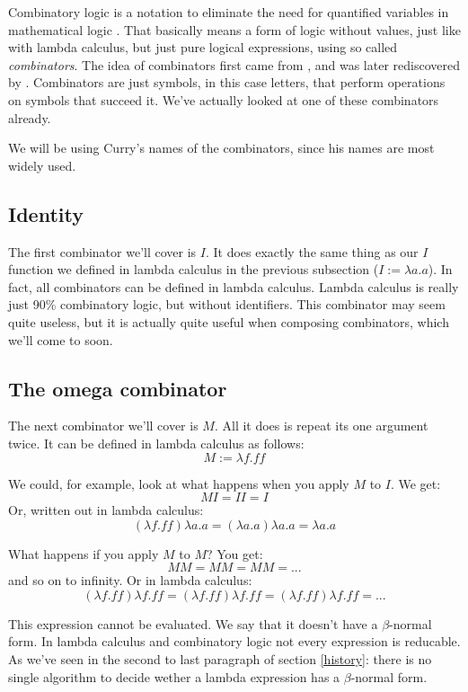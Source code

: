 \documentclass[11pt]{book}
\begin{document}
Combinatory logic is a notation to eliminate the need for quantified variables
in mathematical logic \parencite{wiki:Combinatory_logic}. That basically means
a form of logic without values, just like with lambda calculus, but just pure
logical expressions, using so called \emph{combinators}. The idea of
combinators first came from \textcite{schonfinkel1924}, and was later
rediscovered by \textcite{curry1930}. Combinators are just symbols, in this
case letters, that perform operations on symbols that succeed it. We've
actually looked at one of these combinators already.

We will be using Curry's names of the combinators, since his names are most
widely used.

\subsection{Identity}

The first combinator we'll cover is \(I\). It does exactly the same thing as
our \(I\) function we defined in lambda calculus in the previous subsection
(\(I:=\lambda a.a\)). In fact, all combinators can be defined in lambda
calculus. Lambda calculus is really just 90\% combinatory logic, but without
identifiers. This combinator may seem quite useless, but it is actually quite
useful when composing combinators, which we'll come to soon.

\subsection{The omega combinator}

The next combinator we'll cover is \(M\). All it does is repeat its one
argument twice. It can be defined in lambda calculus as follows:
\[M:=\lambda f.ff\]

We could, for example, look at what happens when you apply \(M\) to \(I\). We
get:
\[M I = I I = I\]
Or, written out in lambda calculus:
\[(\lambda f.ff)\lambda a.a=(\lambda a.a)\lambda a.a=\lambda a.a\]

What happens if you apply \(M\) to \(M\)? You get:
\[M M = M M = M M = ...\]
and so on to infinity. Or in lambda calculus:
\[(\lambda f.ff)\lambda f.ff=(\lambda f.ff)\lambda f.ff=(\lambda f.ff)\lambda f.ff=...\]

This expression cannot be evaluated. We say that it doesn't have a
\(\beta\)-normal form. In lambda calculus and combinatory logic not every
expression is reducable. As we've seen in the second to last paragraph of
section \ref{history}: there is no single algorithm to decide wether a lambda
expression has a \(\beta\)-normal form.
\end{document}
